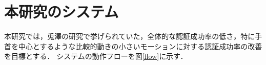 \documentclass[11pt]{jarticle}
\begin{document}

\section{本研究のシステム}
本研究では，兎澤の研究\cite{tozawa}で挙げられていた，全体的な認証成功率の低さ，特に手首を中心とするような比較的動きの小さいモーションに対する認証成功率の改善を目標とする．
システムの動作フローを図\ref{flow}に示す．
\end{document}
